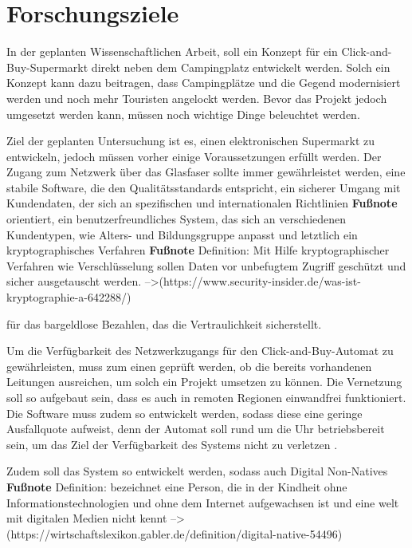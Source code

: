 \section{Forschungsziele}


In der geplanten Wissenschaftlichen Arbeit, soll ein Konzept für ein Click-and-Buy-Supermarkt direkt neben dem Campingplatz 
entwickelt werden. Solch ein Konzept kann dazu beitragen, dass Campingplätze und die Gegend
modernisiert werden und noch mehr Touristen angelockt werden. Bevor das Projekt jedoch umgesetzt 
werden kann, müssen noch wichtige Dinge beleuchtet werden. 


Ziel der geplanten Untersuchung ist es, einen elektronischen Supermarkt zu entwickeln, jedoch müssen vorher einige Voraussetzungen erfüllt werden.
Der Zugang zum Netzwerk über das Glasfaser sollte immer gewährleistet werden, eine stabile 
Software, die den Qualitätsstandards entspricht, ein sicherer Umgang mit Kundendaten, der sich an 
spezifischen und internationalen Richtlinien \textbf{Fußnote} orientiert, ein benutzerfreundliches System, das sich an 
verschiedenen Kundentypen, wie Alters- und Bildungsgruppe anpasst und letztlich ein kryptographisches
Verfahren \textbf{Fußnote} 
Definition: Mit Hilfe kryptographischer Verfahren wie Verschlüsselung sollen Daten vor unbefugtem Zugriff geschützt und sicher ausgetauscht werden.
-->(https://www.security-insider.de/was-ist-kryptographie-a-642288/)

für das bargeldlose Bezahlen, das die Vertraulichkeit sicherstellt.


Um die Verfügbarkeit des Netzwerkzugangs für den Click-and-Buy-Automat zu gewährleisten, muss zum einen 
geprüft werden, ob die bereits vorhandenen Leitungen ausreichen, um solch ein Projekt umsetzen zu können.
Die Vernetzung soll so aufgebaut sein, dass es auch in remoten Regionen einwandfrei funktioniert. 
Die Software muss zudem so entwickelt werden, sodass diese eine geringe Ausfallquote aufweist, 
denn der Automat soll rund um die Uhr betriebsbereit sein, um das Ziel der Verfügbarkeit des
 Systems nicht zu verletzen \cite{refbook:SWIS}.


Zudem soll das System so entwickelt werden, sodass auch Digital Non-Natives \textbf{Fußnote}
Definition: bezeichnet eine Person, die in der Kindheit ohne Informationstechnologien und ohne dem Internet aufgewachsen ist 
und eine welt mit digitalen Medien nicht kennt
-->(https://wirtschaftslexikon.gabler.de/definition/digital-native-54496)

